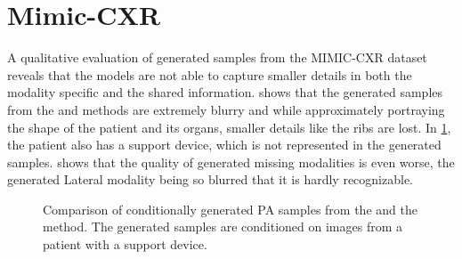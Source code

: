 \section{Mimic-CXR} \label{sec:mimic res}
A qualitative evaluation of generated samples from the MIMIC-CXR dataset reveals that the models are not able to capture smaller details in both the modality specific and the shared information.
 shows that the generated samples from the  and  methods are extremely blurry and while approximately portraying the shape of the patient and its organs, smaller details like the ribs are lost.
In \cref{fig:mimic_lat_pa_example}, the patient also has a support device, which is not represented in the generated samples.
 shows that the quality of generated missing modalities is even worse, the generated Lateral modality being so blurred that it is hardly recognizable.

\begin{figure}[h!]
    \centering
    \caption{Comparison of conditionally generated PA samples from the  and the  method.
    The generated samples are conditioned on images from a patient with a support device.}
    \label{fig:mimic_lat_pa_example}
\end{figure}
